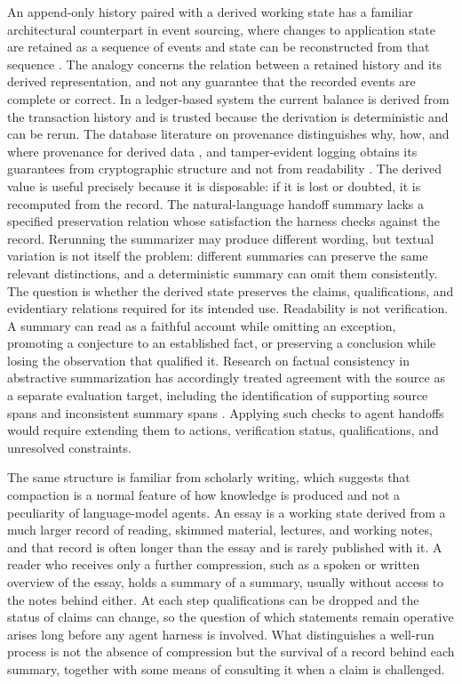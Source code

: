 \documentclass[11pt]{article}
\begin{document}
An append-only history paired with a derived working state has a familiar architectural counterpart in event sourcing, where changes to application state are retained as a sequence of events and state can be reconstructed from that sequence \cite{fowler2005}. The analogy concerns the relation between a retained history and its derived representation, and not any guarantee that the recorded events are complete or correct. In a ledger-based system the current balance is derived from the transaction history and is trusted because the derivation is deterministic and can be rerun. The database literature on provenance distinguishes why, how, and where provenance for derived data \cite{cheney}, and tamper-evident logging obtains its guarantees from cryptographic structure and not from readability \cite{schneier,crosby}. The derived value is useful precisely because it is disposable: if it is lost or doubted, it is recomputed from the record. The natural-language handoff summary lacks a specified preservation relation whose satisfaction the harness checks against the record. Rerunning the summarizer may produce different wording, but textual variation is not itself the problem: different summaries can preserve the same relevant distinctions, and a deterministic summary can omit them consistently. The question is whether the derived state preserves the claims, qualifications, and evidentiary relations required for its intended use. Readability is not verification. A summary can read as a faithful account while omitting an exception, promoting a conjecture to an established fact, or preserving a conclusion while losing the observation that qualified it. Research on factual consistency in abstractive summarization has accordingly treated agreement with the source as a separate evaluation target, including the identification of supporting source spans and inconsistent summary spans \cite{kryscinski2020}. Applying such checks to agent handoffs would require extending them to actions, verification status, qualifications, and unresolved constraints.

The same structure is familiar from scholarly writing, which suggests that compaction is a normal feature of how knowledge is produced and not a peculiarity of language-model agents. An essay is a working state derived from a much larger record of reading, skimmed material, lectures, and working notes, and that record is often longer than the essay and is rarely published with it. A reader who receives only a further compression, such as a spoken or written overview of the essay, holds a summary of a summary, usually without access to the notes behind either. At each step qualifications can be dropped and the status of claims can change, so the question of which statements remain operative arises long before any agent harness is involved. What distinguishes a well-run process is not the absence of compression but the survival of a record behind each summary, together with some means of consulting it when a claim is challenged.
\end{document}

